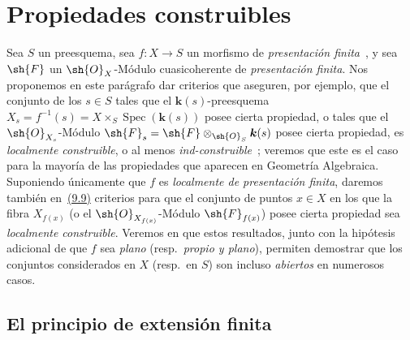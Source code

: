 \section{Propiedades construibles}
\label{section:IV.9}

Sea $S$ un preesquema, sea $f:X\to S$ un morfismo de \emph{presentación finita}~,
y sea $\sh{F}$ un $\sh{O}_X$-Módulo cuasicoherente de \emph{presentación finita}.
Nos proponemos en este parágrafo dar criterios que aseguren, por ejemplo, que el conjunto de los $s\in S$ tales que el $\boldsymbol{k}(s)$-preesquema $X_s=f^{-1}(s)=X\times_S\operatorname{Spec}(\boldsymbol{k}(s))$ posee cierta propiedad, o tales que el $\sh{O}_{X_s}$-Módulo $\sh{F}_s=\sh{F}\otimes_{\sh{O}_S}\boldsymbol{k}(s)$ posee cierta propiedad, es \emph{localmente construible}, o al menos \emph{ind-construible}~; veremos que este es el caso para la mayoría de las propiedades que aparecen en Geometría Algebraica.
Suponiendo únicamente que $f$ es \emph{localmente de presentación finita}, daremos también en~{\hyperlink{ega4.c04.subsec.9-9}{(9.9)}} criterios para que el conjunto de puntos $x\in X$ en los que la fibra $X_{f(x)}$ (o el $\sh{O}_{X_{f(x)}}$-Módulo $\sh{F}_{f(x)}$) posee cierta propiedad sea \emph{localmente construible}.
Veremos en  que estos resultados, junto con la hipótesis adicional de que $f$ sea \emph{plano} (resp.\ \emph{propio y plano}), permiten demostrar que los conjuntos considerados en $X$ (resp.\ en $S$) son incluso \emph{abiertos} en numerosos casos.

\subsection{El principio de extensión finita}
\label{subsection:IV.9.1}

